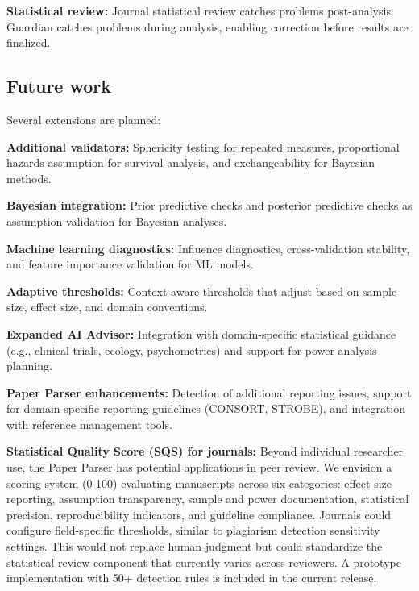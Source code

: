 \documentclass[article]{jss}
\begin{document}
\textbf{Statistical review:} Journal statistical review catches problems post-analysis. Guardian catches problems during analysis, enabling correction before results are finalized.

\subsection{Future work}

Several extensions are planned:

\textbf{Additional validators:} Sphericity testing for repeated measures, proportional hazards assumption for survival analysis, and exchangeability for Bayesian methods.

\textbf{Bayesian integration:} Prior predictive checks and posterior predictive checks as assumption validation for Bayesian analyses.

\textbf{Machine learning diagnostics:} Influence diagnostics, cross-validation stability, and feature importance validation for ML models.

\textbf{Adaptive thresholds:} Context-aware thresholds that adjust based on sample size, effect size, and domain conventions.

\textbf{Expanded AI Advisor:} Integration with domain-specific statistical guidance (e.g., clinical trials, ecology, psychometrics) and support for power analysis planning.

\textbf{Paper Parser enhancements:} Detection of additional reporting issues, support for domain-specific reporting guidelines (CONSORT, STROBE), and integration with reference management tools.

\textbf{Statistical Quality Score (SQS) for journals:} Beyond individual researcher use, the Paper Parser has potential applications in peer review. We envision a scoring system (0-100) evaluating manuscripts across six categories: effect size reporting, assumption transparency, sample and power documentation, statistical precision, reproducibility indicators, and guideline compliance. Journals could configure field-specific thresholds, similar to plagiarism detection sensitivity settings. This would not replace human judgment but could standardize the statistical review component that currently varies across reviewers. A prototype implementation with 50+ detection rules is included in the current release.

\end{document}
